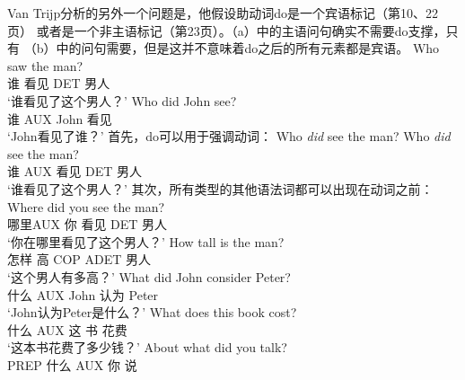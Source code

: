 Van Trijp分析的另外一个问题是，他假设助动词do是一个宾语标记（第10、22页） 或者是一个非主语标记（第23页）。（a）中的主语问句确实不需要do支撑，只有 （b）中的问句需要，但是这并不意味着do之后的所有元素都是宾语。
\eal
\ex 
\gll Who saw the man?\\  
     谁 看见 DET 男人\\
\glt `谁看见了这个男人？'
\ex 
\gll Who did John see?\\  
     谁 AUX John 看见\\
\glt `John看见了谁？'
\zl
首先，do可以用于强调动词：
\ea
Who \emph{did} see the man?
\gll Who \emph{did} see the man?\\  
     谁 AUX 看见 DET 男人\\
\glt `谁看见了这个男人？'
\z
其次，所有类型的其他语法词都可以出现在动词之前：
\eal
\settowidth{}
\ex
\gll Where did you see the man?\\    
     哪里AUX 你 看见 DET 男人\\
\glt `你在哪里看见了这个男人？'
\ex 
\gll How tall is the man?\\     
     怎样 高 COP ADET 男人\\
\glt `这个男人有多高？'
\ex
\gll What did John consider Peter?\\      
     什么 AUX John 认为 Peter\\
\glt `John认为Peter是什么？'
\ex 
\gll What does this book cost?\\       
     什么 AUX 这 书 花费\\
\glt `这本书花费了多少钱？'
\ex 
\gll About what did you talk?\\       
     PREP 什么 AUX 你 说\\
